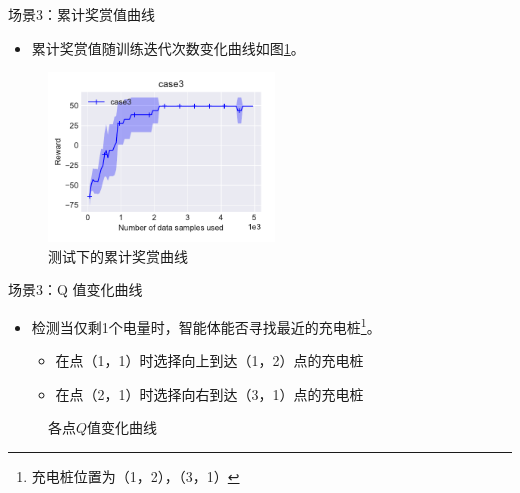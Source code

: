\documentclass{beamer}
\begin{document}
\begin{frame}{场景3：累计奖赏值曲线}
    \begin{itemize}
        \item 累计奖赏值随训练迭代次数变化曲线如图\ref{fig:case3}。
    \end{itemize}
\begin{figure}
    \centering
    \includegraphics[width=6.0cm]{pic/case3/case1.pdf}
    \caption{测试下的累计奖赏曲线}
    \label{fig:case3}
\end{figure}
\end{frame}

\begin{frame}{场景3：Q 值变化曲线}
    \begin{itemize}
        \item 检测当仅剩1个电量时，智能体能否寻找最近的充电桩\footnote{充电桩位置为（1，2），（3，1）}。
        \begin{itemize}
            \item 在点（1，1）时选择向上到达（1，2）点的充电桩
            \item 在点（2，1）时选择向右到达（3，1）点的充电桩
        \end{itemize}
    \end{itemize}
    \begin{figure}
      \centering
      \qquad
      \qquad
    \caption{各点$Q$值变化曲线}
    \label{fig:case3qvalue}
    \end{figure}
\end{frame}
\end{document}
